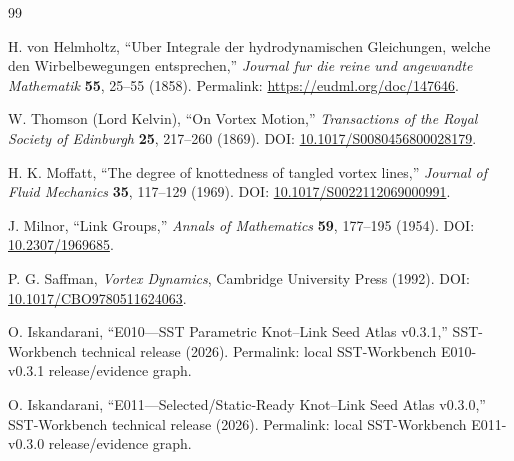 \begin{thebibliography}{99}

H. von Helmholtz,
``Uber Integrale der hydrodynamischen Gleichungen, welche den Wirbelbewegungen entsprechen,''
\emph{Journal fur die reine und angewandte Mathematik} \textbf{55}, 25--55 (1858).
Permalink: \url{https://eudml.org/doc/147646}.

W. Thomson (Lord Kelvin),
``On Vortex Motion,''
\emph{Transactions of the Royal Society of Edinburgh} \textbf{25}, 217--260 (1869).
DOI: \href{https://doi.org/10.1017/S0080456800028179}{10.1017/S0080456800028179}.

H. K. Moffatt,
``The degree of knottedness of tangled vortex lines,''
\emph{Journal of Fluid Mechanics} \textbf{35}, 117--129 (1969).
DOI: \href{https://doi.org/10.1017/S0022112069000991}{10.1017/S0022112069000991}.

J. Milnor,
``Link Groups,''
\emph{Annals of Mathematics} \textbf{59}, 177--195 (1954).
DOI: \href{https://doi.org/10.2307/1969685}{10.2307/1969685}.

P. G. Saffman,
\emph{Vortex Dynamics},
Cambridge University Press (1992).
DOI: \href{https://doi.org/10.1017/CBO9780511624063}{10.1017/CBO9780511624063}.

O. Iskandarani,
``E010---SST Parametric Knot--Link Seed Atlas v0.3.1,''
SST-Workbench technical release (2026).
Permalink: local SST-Workbench E010-v0.3.1 release/evidence graph.

O. Iskandarani,
``E011---Selected/Static-Ready Knot--Link Seed Atlas v0.3.0,''
SST-Workbench technical release (2026).
Permalink: local SST-Workbench E011-v0.3.0 release/evidence graph.

\end{thebibliography}
